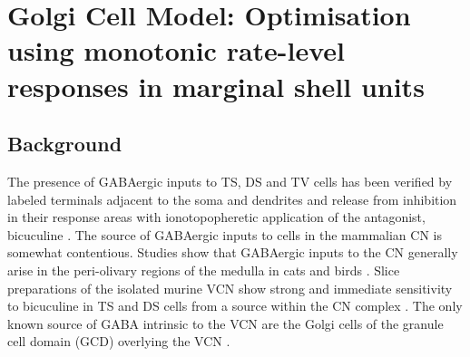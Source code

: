 
\graphicspath{{../figures/}{./gfx/}{/media/data/Work/cnstellate/golgi/}{/media/data/Work/cnstellate/}}

\section[Golgi Cell Model]{Golgi Cell Model: Optimisation using monotonic
  rate-level responses in marginal shell units}
\label{sec:GolgiCellModel}

\subsection{Background}

The presence of GABAergic inputs to TS, DS and TV cells has been verified by
labeled terminals adjacent to the soma and dendrites
\citep{SmithRhode:1989,AwatramaniTurecekEtAl:2005,BabalianRyugoEtAl:2003} and
release from inhibition in their response areas with ionotopopheretic
application of the \GABAa antagonist, bicuculine
\citep{EvansZhao:1998,CasparyBackoffEtAl:1994,BackoffShadduckEtAl:1999,FerragamoGoldingEtAl:1998a}. The
source of GABAergic inputs to cells in the mammalian CN is somewhat
contentious. Studies show that GABAergic inputs to the CN generally arise in the
peri-olivary regions of the medulla in cats \citep{OstapoffBensonEtAl:1997} and
birds \citep{LachicaRubsamenEtAl:1995,YangMonsivaisEtAl:1999}. Slice
preparations of the isolated murine VCN show strong and immediate sensitivity to
bicuculine in TS and DS cells from a source within the CN complex
\citep{FerragamoGoldingEtAl:1998a}.  The only known source of GABA intrinsic to
the VCN are the Golgi cells of the granule cell domain (GCD) overlying the VCN
\citep[Fig.~\ref{fig:CNdiagram}]{Mugnaini:1985,FerragamoGoldingEtAl:1998}.



